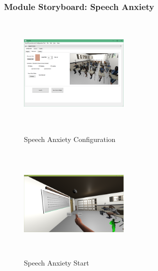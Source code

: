 \documentclass[a4paper,10pt]{article}
\begin{document}
\pagebreak
\subsubsection{Module Storyboard: Speech Anxiety}
\begin{figure}[H]
	\centering
	\begin{minipage}{0.45\textwidth}
		\centering
		\includegraphics[width=200px, height=210px, keepaspectratio]{qtSpeechSettings.png}
		\caption{Speech Anxiety Configuration}
		\label{fig:qtSpeechSettings}
	\end{minipage}\hfill
	\begin{minipage}{0.45\textwidth}
		\centering
		\includegraphics[width=200px, height=210px, keepaspectratio]{speechSS1.png}
		\caption{Speech Anxiety Start}
		\label{fig:speechSS1}
	\end{minipage}
\end{figure}
\end{document}
